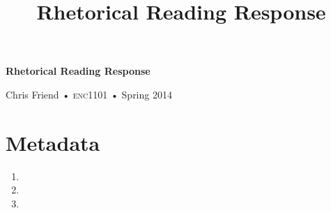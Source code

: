 \documentclass[10pt, oneside]{amsart}	%
\title[Reading Response]{Rhetorical Reading Response}
\begin{document}
%
\thispagestyle{empty}

\begin{center}
\huge

\textbf{Rhetorical Reading Response}

{\normalsize Chris Friend • \textsc{enc1101} • Spring 2014}
\end{center}

\section{Metadata} %
\label{sec:metadata}
\begin{Form}
	\begin{enumerate}
		\item {}
		\item {}
		\item {}
	\end{enumerate}
\end{Form}


\end{document}
